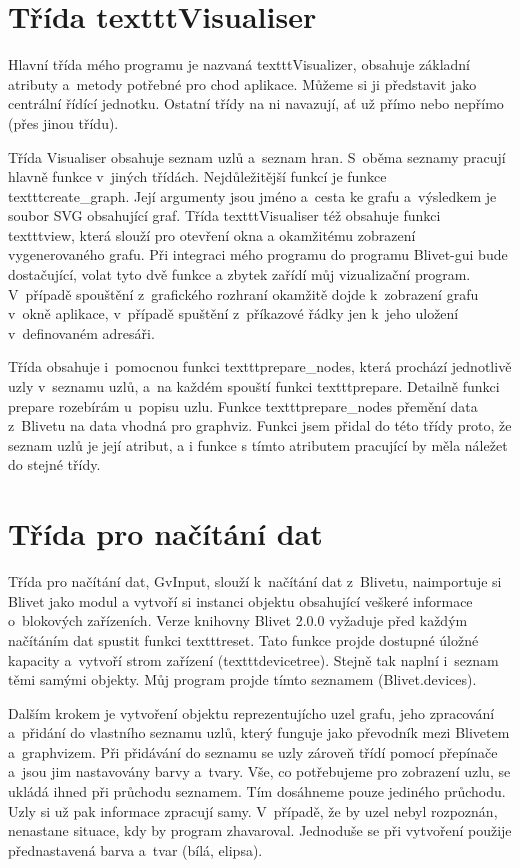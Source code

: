 \documentclass[color,table,oneside,nolot,nolof]{fithesis}
\begin{document}
\section{Třída texttt{Visualiser}}
	Hlavní třída mého programu je nazvaná texttt{Visualizer}, obsahuje základní atributy a~metody potřebné pro chod aplikace. Můžeme si ji představit jako centrální řídící jednotku. Ostatní
	třídy na ni navazují, ať už přímo nebo nepřímo (přes jinou třídu). 

	Třída Visualiser obsahuje seznam uzlů a~seznam hran. S~oběma seznamy pracují hlavně funkce v~jiných třídách. Nejdůležitější funkcí
	je funkce texttt{create\_graph}. Její argumenty jsou jméno a~cesta ke grafu a~výsledkem je soubor SVG obsahující graf. 
	Třída texttt{Visualiser} též obsahuje funkci texttt{view}, která slouží pro otevření okna a okamžitému zobrazení vygenerovaného grafu. Při integraci mého programu do programu Blivet-gui bude dostačující,
	volat tyto dvě funkce a zbytek zařídí můj vizualizační program.
	V~případě spouštění z~grafického rozhraní okamžitě dojde k~zobrazení grafu v~okně aplikace, v~případě spuštění z~příkazové řádky jen k~jeho uložení v~definovaném adresáři. 

	Třída obsahuje i~pomocnou funkci texttt{prepare\_nodes}, která prochází jednotlivě uzly v~seznamu uzlů, a~na každém spouští funkci texttt{prepare}. Detailně funkci prepare rozebírám u~popisu uzlu.
	Funkce texttt{prepare\_nodes}
	přemění data z~Blivetu na data vhodná pro graphviz. Funkci jsem přidal do této třídy proto, že seznam uzlů je její atribut, a i funkce s tímto atributem pracující by měla náležet do stejné třídy.

\section{Třída pro načítání dat}
	Třída pro načítání dat, GvInput, slouží k~načítání dat z~Blivetu, naimportuje si Blivet jako modul a vytvoří si instanci objektu obsahující veškeré informace
	o~blokových zařízeních. Verze knihovny Blivet 2.0.0 vyžaduje před 
	každým načítáním dat spustit funkci texttt{reset}. Tato funkce projde dostupné úložné kapacity a~vytvoří strom zařízení (texttt{devicetree}). Stejně tak naplní i~seznam těmi
	samými objekty. Můj program projde tímto seznamem (Blivet.devices).

	Dalším krokem je vytvoření objektu reprezentujícho uzel grafu, jeho zpracování a~přidání do vlastního seznamu uzlů, který funguje jako převodník mezi Blivetem a~graphvizem. Při
	přidávání do seznamu se uzly zároveň třídí pomocí přepínače a~jsou jim nastavovány barvy a~tvary. Vše, co potřebujeme pro zobrazení uzlu, se ukládá ihned při průchodu seznamem. 
	Tím dosáhneme pouze jediného průchodu. Uzly si už pak informace zpracují samy. V~případě, že by uzel nebyl rozpoznán, nenastane situace, kdy by program 
	zhavaroval. Jednoduše se při vytvoření použije přednastavená barva a~tvar (bílá, elipsa).
\end{document}
